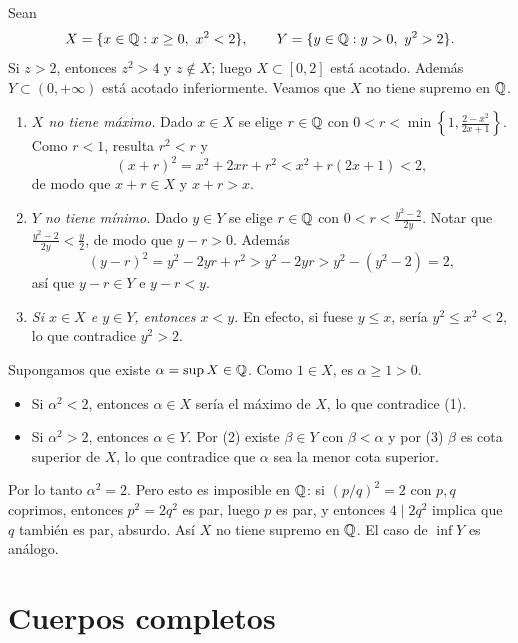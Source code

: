 \begin{eg}
  Sean
  \[
    X = \{ x \in \mathbb{Q} : x \geq 0,\ x^2 < 2 \}, \qquad Y = \{ y \in \mathbb{Q} : y > 0,\ y^2 > 2 \}.
  \]
  Si \(z > 2\), entonces \(z^2 > 4\) y \(z \notin X\); luego \(X \subset [0, 2]\) está acotado. Además \(Y \subset (0, +\infty)\) está acotado inferiormente. Veamos que \(X\) no tiene supremo en \(\mathbb{Q}\).

  \begin{enumerate}[label=(\arabic*)]
    \item \emph{\(X\) no tiene máximo.} Dado \(x \in X\) se elige \(r \in \mathbb{Q}\) con \(0 < r < \min\left\{1, \frac{2 - x^2}{2x + 1}\right\}\). Como \(r < 1\), resulta \(r^2 < r\) y
          \[
            {(x + r)}^2 = x^2 + 2xr + r^2 < x^2 + r(2x + 1) < 2,
          \]
          de modo que \(x + r \in X\) y \(x + r > x\).
    \item \emph{\(Y\) no tiene mínimo.} Dado \(y \in Y\) se elige \(r \in \mathbb{Q}\) con \(0 < r < \frac{y^2 - 2}{2y}\). Notar que \(\frac{y^2-2}{2y} < \frac{y}{2}\), de modo que \(y - r > 0\). Además
          \[
            {(y - r)}^2 = y^2 - 2yr + r^2 > y^2 - 2yr > y^2 - (y^2 - 2) = 2,
          \]
          así que \(y - r \in Y\) e \(y - r < y\).
    \item \emph{Si \(x \in X\) e \(y \in Y\), entonces \(x < y\).} En efecto, si fuese \(y \leq x\), sería \(y^2 \leq x^2 < 2\), lo que contradice \(y^2 > 2\).
  \end{enumerate}

  Supongamos que existe \(\alpha = \sup X \in \mathbb{Q}\). Como \(1 \in X\), es \(\alpha \geq 1 > 0\).
  \begin{itemize}
    \item Si \(\alpha^2 < 2\), entonces \(\alpha \in X\) sería el máximo de \(X\), lo que contradice (1).
    \item Si \(\alpha^2 > 2\), entonces \(\alpha \in Y\). Por (2) existe \(\beta \in Y\) con \(\beta < \alpha\) y por (3) \(\beta\) es cota superior de \(X\), lo que contradice que \(\alpha\) sea la menor cota superior.
  \end{itemize}
  Por lo tanto \(\alpha^2 = 2\). Pero esto es imposible en \(\mathbb{Q}\): si \({(p/q)}^2 = 2\) con \(p, q\) coprimos, entonces \(p^2 = 2q^2\) es par, luego \(p\) es par, y entonces \(4 \mid 2q^2\) implica que \(q\) también es par, absurdo. Así \(X\) no tiene supremo en \(\mathbb{Q}\). El caso de \(\inf Y\) es análogo.
\end{eg}

\section{Cuerpos completos}

